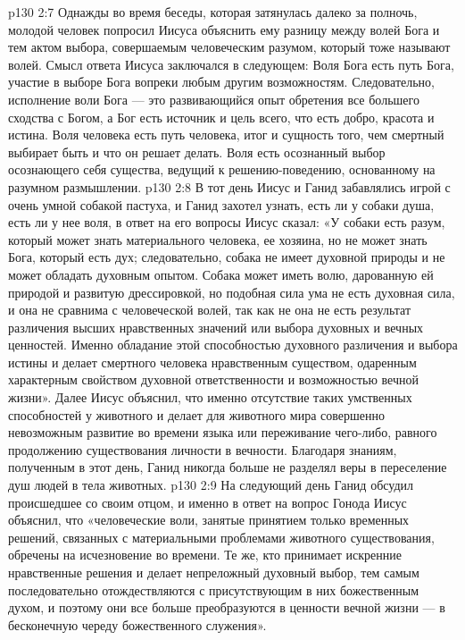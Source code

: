 \vs p130 2:7 Однажды во время беседы, которая затянулась далеко за полночь, молодой человек попросил Иисуса объяснить ему разницу между волей Бога и тем актом выбора, совершаемым человеческим разумом, который тоже называют волей. Смысл ответа Иисуса заключался в следующем: Воля Бога есть путь Бога, участие в выборе Бога вопреки любым другим возможностям. Следовательно, исполнение воли Бога --- это развивающийся опыт обретения все большего сходства с Богом, а Бог есть источник и цель всего, что есть добро, красота и истина. Воля человека есть путь человека, итог и сущность того, чем смертный выбирает быть и что он решает делать. Воля есть осознанный выбор осознающего себя существа, ведущий к решению\hyp{}поведению, основанному на разумном размышлении.
\vs p130 2:8 В тот день Иисус и Ганид забавлялись игрой с очень умной собакой пастуха, и Ганид захотел узнать, есть ли у собаки душа, есть ли у нее воля, в ответ на его вопросы Иисус сказал: «У собаки есть разум, который может знать материального человека, ее хозяина, но не может знать Бога, который есть дух; следовательно, собака не имеет духовной природы и не может обладать духовным опытом. Собака может иметь волю, дарованную ей природой и развитую дрессировкой, но подобная сила ума не есть духовная сила, и она не сравнима с человеческой волей, так как не  она не есть результат различения высших нравственных значений или выбора духовных и вечных ценностей. Именно обладание этой способностью духовного различения и выбора истины и делает смертного человека нравственным существом, одаренным характерным свойством духовной ответственности и возможностью вечной жизни». Далее Иисус объяснил, что именно отсутствие таких умственных способностей у животного и делает для животного мира совершенно невозможным развитие во времени языка или переживание чего\hyp{}либо, равного продолжению существования личности в вечности. Благодаря знаниям, полученным в этот день, Ганид никогда больше не разделял веры в переселение душ людей в тела животных.
\vs p130 2:9 \pc На следующий день Ганид обсудил происшедшее со своим отцом, и именно в ответ на вопрос Гонода Иисус объяснил, что «человеческие воли, занятые принятием только временных решений, связанных с материальными проблемами животного существования, обречены на исчезновение во времени. Те же, кто принимает искренние нравственные решения и делает непреложный духовный выбор, тем самым последовательно отождествляются с присутствующим в них божественным духом, и поэтому они все больше преобразуются в ценности вечной жизни --- в бесконечную череду божественного служения».
